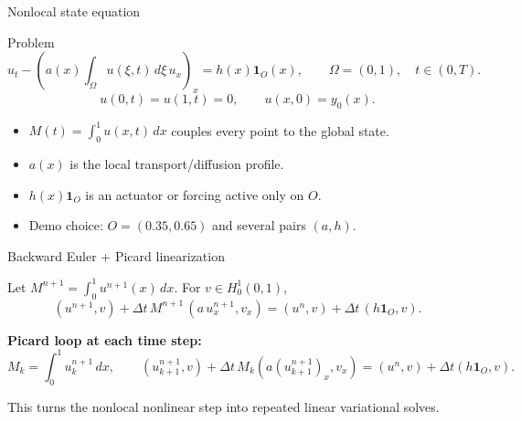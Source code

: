\documentclass[aspectratio=169, 11pt]{beamer}
\begin{document}
\begin{frame}{Nonlocal state equation}

\begin{block}{Problem}
\[
    u_t -
    \left(
        a(x)
        \int_\Omega u(\xi,t)\,d\xi
        \,u_x
    \right)_x
    =
    h(x)\mathbf{1}_O(x),
    \qquad
    \Omega=(0,1),\quad t\in(0,T).
\]
\[
    u(0,t)=u(1,t)=0,
    \qquad
    u(x,0)=y_0(x).
\]
\end{block}

\medskip
\small
\begin{itemize}
    \item $M(t)=\int_0^1 u(x,t)\,dx$ couples every point to the global state.
    \item $a(x)$ is the local transport/diffusion profile.
    \item $h(x)\mathbf{1}_O$ is an actuator or forcing active only on $O$.
    \item Demo choice: $O=(0.35,0.65)$ and several pairs $(a,h)$.
\end{itemize}

\end{frame}

\begin{frame}{Backward Euler + Picard linearization}

Let $M^{n+1}=\int_0^1 u^{n+1}(x)\,dx$.
For $v\in H_0^1(0,1)$,
\[
    (u^{n+1},v)
    + \Delta t\,M^{n+1}\,(a\,u_x^{n+1},v_x)
    =
    (u^n,v)
    + \Delta t\,(h\mathbf{1}_O,v).
\]

\bigskip
\textbf{Picard loop at each time step:}
\[
    M_k = \int_0^1 u_k^{n+1}\,dx,
    \qquad
    (u_{k+1}^{n+1},v)
    + \Delta t\,M_k(a(u_{k+1}^{n+1})_x,v_x)
    =
    (u^n,v)+\Delta t(h\mathbf{1}_O,v).
\]

\medskip
\small
This turns the nonlocal nonlinear step into repeated linear variational solves.

\end{frame}
\end{document}
